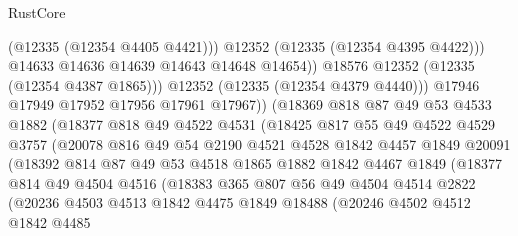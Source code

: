 \begin{lexlean}{RustCore}
\begin{coremodule}
                              (@12335 (@12354 @4405 @4421)))
                            @12352
                            (@12335 (@12354 @4395 @4422)))
                          @14633
                          @14636
                          @14639
                          @14643
                          @14648
                          @14654))
                      @18576
                      @12352
                      (@12335 (@12354 @4387 @1865)))
                    @12352
                    (@12335 (@12354 @4379 @4440)))
                  @17946
                  @17949
                  @17952
                  @17956
                  @17961
                  @17967))
              (@18369
                @818
                @87
                @49
                @53
                @4533
                @1882
                (@18377
                  @818
                  @49
                  @4522
                  @4531
                  (@18425
                    @817
                    @55
                    @49
                    @4522
                    @4529
                    @3757
                    (@20078
                      @816
                      @49
                      @54
                      @2190
                      @4521
                      @4528
                      @1842
                      @4457
                      @1849
                      @20091
                      (@18392
                        @814
                        @87
                        @49
                        @53
                        @4518
                        @1865
                        @1882
                        @1842
                        @4467
                        @1849
                        (@18377
                          @814
                          @49
                          @4504
                          @4516
                          (@18383
                            @365
                            @807
                            @56
                            @49
                            @4504
                            @4514
                            @2822
                            (@20236
                              @4503
                              @4513
                              @1842
                              @4475
                              @1849
                              @18488
                              (@20246
                                @4502
                                @4512
                                @1842
                                @4485

\end{coremodule}
\end{lexlean}
